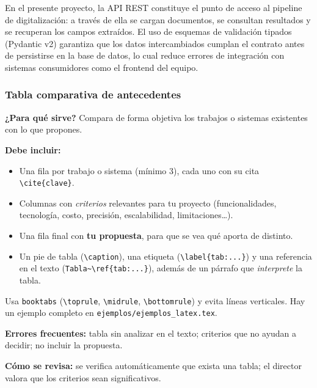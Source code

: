 En el presente proyecto, la API REST constituye el punto de acceso al pipeline de digitalización: a través de ella se cargan documentos, se consultan resultados y se recuperan los campos extraídos. El uso de esquemas de validación tipados (Pydantic v2) garantiza que los datos intercambiados cumplan el contrato antes de persistirse en la base de datos, lo cual reduce errores de integración con sistemas consumidores como el frontend del equipo\cite{fastapi_docs}.


\subsubsection{Tabla comparativa de antecedentes} \label{subsec:tabla_comparativa_antecedentes} %

\begin{guia}
\textbf{¿Para qué sirve?} Compara de forma objetiva los trabajos o sistemas existentes con lo que propones.

\textbf{Debe incluir:}
\begin{itemize}[nosep,leftmargin=*]
  \item Una fila por trabajo o sistema (mínimo 3), cada uno con su cita \verb|\cite{clave}|.
  \item Columnas con \emph{criterios} relevantes para tu proyecto (funcionalidades, tecnología, costo, precisión,
        escalabilidad, limitaciones\ldots).
  \item Una fila final con \textbf{tu propuesta}, para que se vea qué aporta de distinto.
  \item Un pie de tabla (\verb|\caption|), una etiqueta (\verb|\label{tab:...}|) y una referencia en el texto
        (\verb|Tabla~\ref{tab:...}|), además de un párrafo que \emph{interprete} la tabla.
\end{itemize}
Usa \verb|booktabs| (\verb|\toprule|, \verb|\midrule|, \verb|\bottomrule|) y evita líneas verticales. Hay un ejemplo
completo en \texttt{ejemplos/ejemplos\_latex.tex}.

\textbf{Errores frecuentes:} tabla sin analizar en el texto; criterios que no ayudan a decidir; no incluir la propuesta.

\textbf{Cómo se revisa:} se verifica automáticamente que exista una tabla; el director valora que los criterios sean
significativos.
\end{guia}

